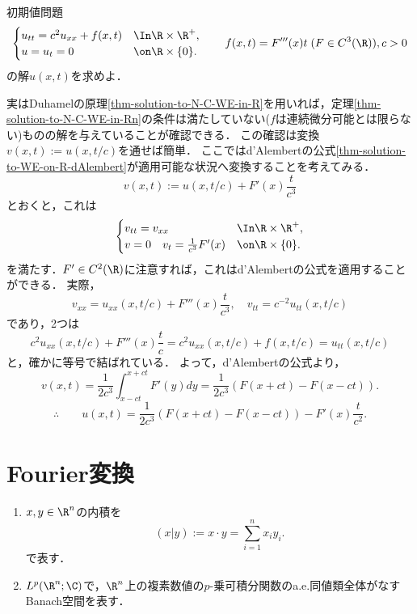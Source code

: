\documentclass[uplatex,dvipdfmx]{jsreport}
\begin{document}
\begin{problem}
    初期値問題
    \[\begin{cases}
        u_{tt}=c^2u_{xx}+f(x,t)&\In\R\times\R^+,\\
        u=u_t=0&\on\R\times\{0\}.
    \end{cases}\qquad f(x,t)=F'''(x)t\;(F\in C^3(\R)),c>0\]
    の解$u(x,t)$を求めよ．
\end{problem}
\begin{Proof}[\underline{\bf【解】}]
    実はDuhamelの原理\ref{thm-solution-to-N-C-WE-in-R}を用いれば，定理\ref{thm-solution-to-N-C-WE-in-Rn}の条件は満たしていない($f$は連続微分可能とは限らない)ものの解を与えていることが確認できる．
    この確認は変換$v(x,t):=u(x,t/c)$を通せば簡単．
    ここではd'Alembertの公式\ref{thm-solution-to-WE-on-R-dAlembert}が適用可能な状況へ変換することを考えてみる．
    \[v(x,t):=u(x,t/c)+F'(x)\frac{t}{c^3}\]
    とおくと，これは
    \[\begin{cases}
        v_{tt}=v_{xx}&\In\R\times\R^+,\\
        v=0\quad v_t=\frac{1}{c^3}F'(x)&\on\R\times\{0\}.
    \end{cases}\]
    を満たす．$F'\in C^2(\R)$に注意すれば，これはd'Alembertの公式を適用することができる．
    実際，
    \[v_{xx}=u_{xx}(x,t/c)+F'''(x)\frac{t}{c^3},\quad v_{tt}=c^{-2}u_{tt}(x,t/c)\]
    であり，2つは
    \[c^2u_{xx}(x,t/c)+F'''(x)\frac{t}{c}=c^2u_{xx}(x,t/c)+f(x,t/c)=u_{tt}(x,t/c)\]
    と，確かに等号で結ばれている．
    よって，d'Alembertの公式より，
    \[v(x,t)=\frac{1}{2c^3}\int^{x+ct}_{x-ct}F'(y)dy=\frac{1}{2c^3}(F(x+ct)-F(x-ct)).\]
    \[\therefore\qquad u(x,t)=\frac{1}{2c^3}(F(x+ct)-F(x-ct))-F'(x)\frac{t}{c^2}.\]
\end{Proof}

\chapter{Fourier変換}

\begin{notation*}\mbox{}
    \begin{enumerate}
        \item $x,y\in\R^n$の内積を
        \[(x|y):=x\cdot y=\sum_{i=1}^nx_iy_i.\]
        で表す．
        \item $L^p(\R^n;\C)$で，$\R^n$上の複素数値の$p$-乗可積分関数のa.e.同値類全体がなすBanach空間を表す．
    \end{enumerate}
\end{notation*}
\end{document}

